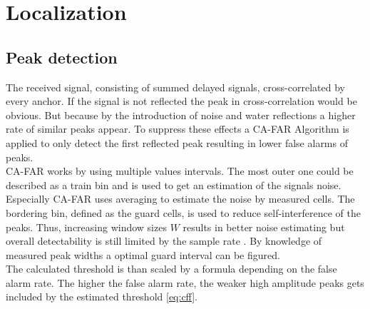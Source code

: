 \chapter{Localization}

\section{Peak detection}

The received signal, consisting of summed delayed signals, cross-correlated by every anchor. If the signal is not reflected the peak in cross-correlation would be obvious. But because by the introduction of noise and water reflections a higher rate of similar peaks appear. To suppress these effects a CA-FAR Algorithm \cite{rohling11} is applied to only detect the first reflected peak resulting in lower false alarms of peaks. \\
CA-FAR works by using multiple values intervals. The most outer one could be described as a train bin and is used to get an estimation of the signals noise. Especially CA-FAR uses averaging to estimate the noise by measured cells. The bordering bin, defined as the guard cells, is used to reduce self-interference of the peaks. Thus, increasing window sizes $W$ results in better noise estimating but overall detectability is still limited by the sample rate  \cite{rohling11}\cite{radarbasics}. By knowledge of measured peak widths a optimal guard interval can be figured.\\
The calculated threshold is than scaled by a formula depending on the false alarm rate. The higher the false alarm rate, the weaker high amplitude peaks gets included by the estimated threshold \ref{eq:cff}.\\
